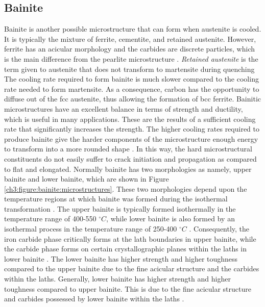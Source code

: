 \subsection{Bainite}
Bainite is another possible microstructure that can form when austenite is cooled. It is typically the mixture of ferrite, cementite, and retained austenite. However, ferrite has an acicular morphology and the carbides are discrete particles, which is the main difference from the pearlite microstructure \cite{molabe2018determining}. \emph{Retained austenite} is the term given to austenite that does not transform to martensite during quenching \cite{bajaj2020steels} The cooling rate required to form bainite is much slower compared to the cooling rate needed to form martensite. As a consequence, carbon has the opportunity to diffuse out of the fcc austenite, thus allowing the formation of bcc ferrite.  
Bainitic microstructures have an excellent balance in terms of strength and ductility, which is useful in many applications. These are the results of a sufficient cooling rate that significantly increases the strength. The higher cooling rates required to produce bainite give the harder components of the microstructure enough energy to transform into a more rounded shape \cite{bajaj2020steels}. In this way, the hard microstructural constituents do not easily suffer to crack initiation and propagation as compared to flat and elongated.
Normally bainite has two morphologies as namely, upper bainite and lower bainite, which are shown in Figure \ref{ch3:figure:bainite:microstructures}. These two morphologies depend upon the temperature regions at which bainite was formed during the isothermal transformation \cite{molabe2018determining}. The upper bainite is typically formed isothermally in the temperature range of 400-550 $^\circ C$, while lower bainite is also formed by an isothermal process in the temperature range of 250-400 $^\circ C$ \cite{molabe2018determining}. Consequently, the iron carbide phase critically forms at the lath boundaries in upper bainite, while the carbide phase forms on certain crystallographic planes within the laths in lower bainite \cite{bajaj2020steels}. The lower bainite has higher strength and higher toughness compared to the upper bainite due to the fine acicular structure and the carbides within the laths. Generally, lower bainite has higher strength and higher toughness compared to upper bainite. This is due to the fine acicular structure and carbides possessed by lower bainite within the laths \cite{molabe2018determining}.
     
